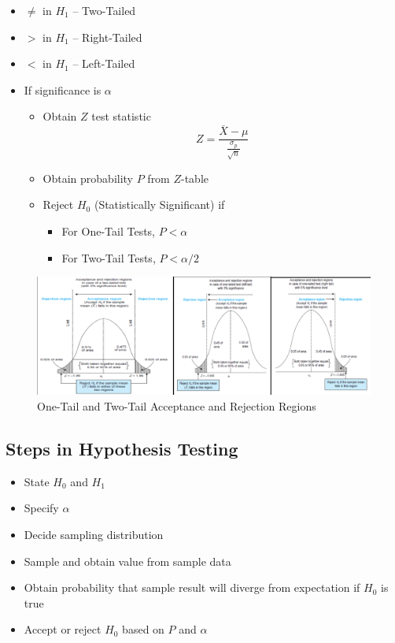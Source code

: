 \documentclass{article}
\begin{document}
\begin{itemize}
    \item $\ne$ in $H_1$ -- Two-Tailed
    \item $>$ in $H_1$ -- Right-Tailed
    \item $<$ in $H_1$ -- Left-Tailed
    \item If significance is $\alpha$
    \begin{itemize}
        \item Obtain $Z$ test statistic
        \begin{equation}
            Z = \frac{\overline{X} - \mu}{\frac{\sigma_p}{\sqrt{n}}}
        \end{equation}
        \item Obtain probability $P$ from $Z$-table
        \item Reject $H_0$ (Statistically Significant) if
            \begin{itemize}
                \item For One-Tail Tests, $P < \alpha$
                \item For Two-Tail Tests, $P < \alpha/2$
            \end{itemize}
    \end{itemize}
\end{itemize}

\begin{figure}[htp]
    \includegraphics[width=1 \linewidth]{img/tail-tests.png}
    \caption{One-Tail and Two-Tail Acceptance and Rejection Regions}
    \label{fig:tail-test}
\end{figure}

\subsection{Steps in Hypothesis Testing}

\begin{itemize}
    \item State $H_0$ and $H_1$
    \item Specify $\alpha$
    \item Decide sampling distribution
    \item Sample and obtain value from sample data
    \item Obtain probability that sample result will diverge from expectation if $H_0$ is true
    \item Accept or reject $H_0$ based on $P$ and $\alpha$
\end{itemize}
\end{document}
